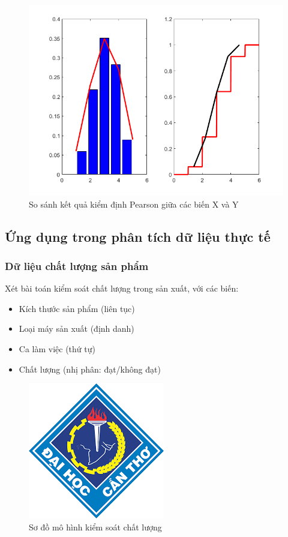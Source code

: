 \begin{figure}[h!]
    \centering
    \includegraphics[width=0.8\linewidth]{../../assets/images/X_Y_PTest.png}
    \caption{So sánh kết quả kiểm định Pearson giữa các biến X và Y}
\end{figure}

\subsection{Ứng dụng trong phân tích dữ liệu thực tế}
\subsubsection*{Dữ liệu chất lượng sản phẩm}
Xét bài toán kiểm soát chất lượng trong sản xuất, với các biến:
\begin{itemize}
    \item Kích thước sản phẩm (liên tục)
    \item Loại máy sản xuất (định danh)
    \item Ca làm việc (thứ tự)
    \item Chất lượng (nhị phân: đạt/không đạt)
\end{itemize}

\begin{figure}[h!]
    \centering
    \includegraphics[width=.8\linewidth]{../../assets/logos/university-logo.png}
    \caption{Sơ đồ mô hình kiểm soát chất lượng}
\end{figure}

